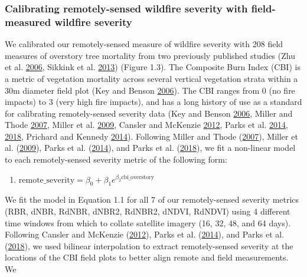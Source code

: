 \documentclass[twoside,12pt,final]{ucthesis-CA2012}
\providecommand{\tightlist}{%
  \setlength{\itemsep}{0pt}\setlength{\parskip}{0pt}}
\begin{document}
\begin{ucmainmatter}
\subsubsection{Calibrating remotely-sensed wildfire severity with
field-measured wildfire
severity}\label{calibrating-remotely-sensed-wildfire-severity-with-field-measured-wildfire-severity}

We calibrated our remotely-sensed measure of wildfire severity with 208
field measures of overstory tree mortality from two previously published
studies (Zhu et al. \protect\hyperlink{ref-zhu2006}{2006}, Sikkink et
al. \protect\hyperlink{ref-sikkink2013}{2013}) (Figure 1.3). The
Composite Burn Index (CBI) is a metric of vegetation mortality across
several vertical vegetation strata within a 30m diameter field plot (Key
and Benson \protect\hyperlink{ref-key2006}{2006}). The CBI ranges from 0
(no fire impacts) to 3 (very high fire impacts), and has a long history
of use as a standard for calibrating remotely-sensed severity data (Key
and Benson \protect\hyperlink{ref-key2006}{2006}, Miller and Thode
\protect\hyperlink{ref-miller2007}{2007}, Miller et al.
\protect\hyperlink{ref-miller2009a}{2009}, Cansler and McKenzie
\protect\hyperlink{ref-cansler2012}{2012}, Parks et al.
\protect\hyperlink{ref-parks2014a}{2014},
\protect\hyperlink{ref-parks2018}{2018}, Prichard and Kennedy
\protect\hyperlink{ref-prichard2014}{2014}). Following Miller and Thode
(\protect\hyperlink{ref-miller2007}{2007}), Miller et al.
(\protect\hyperlink{ref-miller2009a}{2009}), Parks et al.
(\protect\hyperlink{ref-parks2014a}{2014}), and Parks et al.
(\protect\hyperlink{ref-parks2018}{2018}), we fit a non-linear model to
each remotely-sensed severity metric of the following form:
\begin{enumerate}
\def\labelenumi{(\arabic{enumi})}
\tightlist
\item
  \(\label{eq-cbi-calibration} \text{remote\_severity} = \beta_0 + \beta_1 e^{\beta_2 \text{cbi\_overstory}}\)
\end{enumerate}
We fit the model in Equation 1.1 for all 7 of our remotely-sensed
severity metrics (RBR, dNBR, RdNBR, dNBR2, RdNBR2, dNDVI, RdNDVI) using
4 different time windows from which to collate satellite imagery (16,
32, 48, and 64 days). Following Cansler and McKenzie
(\protect\hyperlink{ref-cansler2012}{2012}), Parks et al.
(\protect\hyperlink{ref-parks2014a}{2014}), and Parks et al.
(\protect\hyperlink{ref-parks2018}{2018}), we used bilinear
interpolation to extract remotely-sensed severity at the locations of
the CBI field plots to better align remote and field measurements. We

\end{ucmainmatter}
\end{document}
